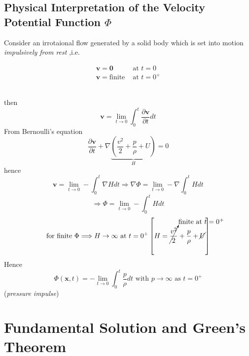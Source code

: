 \subsection{Physical Interpretation of the Velocity Potential Function $\Phi$}
Consider an irrotaional flow generated by a solid body which is set into motion \emph{impulsively from rest} ,i.e.
\begin{minipage}{0.4\textwidth}
\begin{align*}
\mathbf{v}=\mathbf{0} &\text{ at }t = 0\\
\mathbf{v}=\text{finite} &\text{ at }t = 0^+
\end{align*}
\end{minipage} \hfill
\begin{minipage}{0.5\textwidth}
\end{minipage}\\
then
\[
\mathbf{v} = \lim_{t\to 0}\int_0^t\frac{\partial\mathbf{v}}{\partial t}dt
\]
From Bernoulli's equation
\[
\frac{\partial\mathbf{v}}{\partial t} + \nabla\underbrace{\left(\frac{v^2}{2}+\frac{p}{\rho} + U\right)}_{H} = 0
\]
hence
\[
\mathbf{v}=\lim_{t\to 0}-\int_0^t\nabla Hdt\Longrightarrow\nabla\Phi = \lim_{t\to 0}-\nabla\int_0^tHdt
\]
\[
\Longrightarrow\Phi = \lim_{t\to 0}-\int_0^tHdt
\]
\[
\text{for finite }\Phi\Longrightarrow H\to\infty\text{ at }t = 0^+\left[H = \cancelto{\text{finite at $t=0^+$}}{\frac{v^2}{2}}+\frac{p}{\rho} + \cancel{U}\right]
\]
Hence
\[
\Phi(\mathbf{x},t) = -\lim_{t\to 0}\int_0^t\frac{p}{\rho}dt\text{ with }p\to\infty\text{ as }t = 0^+
\]
(\emph{pressure impulse})
\section{Fundamental Solution and Green's Theorem}
